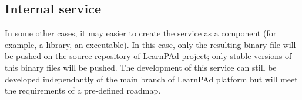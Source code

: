 \subsection{Internal service}
\label{sec:internal-service}

In some other cases, it may easier to create the service as a component (for example, a library, an executable).  In this case, only the resulting binary file will be pushed on the source repository of LearnPAd project; only stable versions of this binary files will be pushed.  The development of this service can still be developed independantly of the main branch of LearnPAd platform but will meet the requirements of a pre-defined roadmap.
